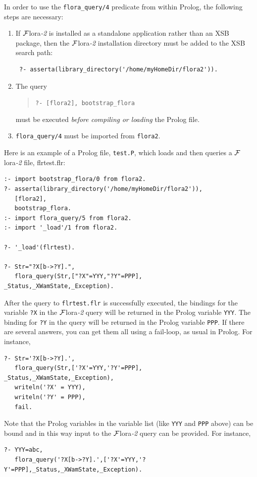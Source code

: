 \documentclass[11pt]{article}
\newcommand{\FLORA}{{\mbox{\sc ${\cal F}${lora}\rm\emph{-2}}}\xspace}
\begin{document}
In order to use the {\tt flora\_query/4} predicate from within Prolog,
the following steps are necessary:
\begin{enumerate}
  \item  If \FLORA is installed as a standalone application rather than an
    XSB package, then the \FLORA installation directory must be added to
    the XSB search path:
\begin{verbatim}
 ?- asserta(library_directory('/home/myHomeDir/flora2')).  
\end{verbatim}
  \item The query
    \begin{quote}
      {\tt ?- [flora2], bootstrap\_flora} 
    \end{quote}
    must be executed \emph{before compiling or loading} the Prolog file.
  \item {\tt flora\_query/4} must be imported from {\tt flora2}.  
\end{enumerate}
Here is an example of a Prolog file, {\tt test.P}, which loads and then
queries a \FLORA file, flrtest.flr:
\begin{verbatim}
:- import bootstrap_flora/0 from flora2.
?- asserta(library_directory('/home/myHomeDir/flora2')),
   [flora2],
   bootstrap_flora. 
:- import flora_query/5 from flora2.
:- import '_load'/1 from flora2.

?- '_load'(flrtest).  

?- Str="?X[b->?Y].",
   flora_query(Str,["?X"=YYY,"?Y"=PPP], _Status,_XWamState,_Exception).
\end{verbatim}
After the query to {\tt flrtest.flr} is successfully executed, the bindings
for the variable {\tt ?X} in the \FLORA query will be returned in the Prolog
variable {\tt YYY}. The binding  for {\tt ?Y} in the query will be returned in the
Prolog variable {\tt PPP}. If there are several answers, you can get them
all using a fail-loop, as usual in Prolog. For instance, 
\begin{verbatim}
?- Str='?X[b->?Y].',
   flora_query(Str,['?X'=YYY,'?Y'=PPP], _Status,_XWamState,_Exception),
   writeln('?X' = YYY),
   writeln('?Y' = PPP),
   fail.
\end{verbatim}
Note that the Prolog variables in the variable list (like {\tt YYY} and
{\tt PPP} above) can be bound and in this way input to the \FLORA query  
can be provided. For instance, 
\begin{verbatim}
?- YYY=abc,
   flora_query('?X[b->?Y].',['?X'=YYY,'?Y'=PPP],_Status,_XWamState,_Exception).
\end{verbatim}
\end{document}
